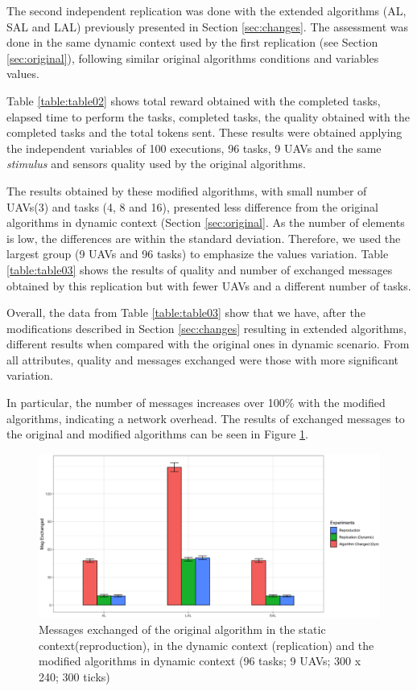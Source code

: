 The second independent replication was done with the extended algorithms (AL, SAL and LAL) previously presented in Section \ref{sec:changes}. The assessment was done in the same dynamic context used by the first replication (see Section \ref{sec:original}), following similar original algorithms conditions and variables values.

Table \ref{table:table02} shows total reward obtained with the completed tasks, elapsed time to perform the tasks, completed tasks, the quality obtained with the completed tasks and the total tokens sent. These results were obtained applying the independent variables of 100 executions, 96 tasks, 9 UAVs and the same \textit{stimulus} and sensors quality used by the original algorithms.



The results obtained by these modified algorithms, with small number of UAVs(3) and tasks (4, 8 and 16), presented less difference from the original algorithms in dynamic context (Section \ref{sec:original}. As the number of elements is low, the differences are within the standard deviation. Therefore, we used the largest group (9 UAVs and 96 tasks) to emphasize the values variation. Table \ref{table:table03} shows the results of quality and number of exchanged messages obtained by this replication but with fewer UAVs and a different number of tasks.



Overall, the data from Table \ref{table:table03} show that we have, after the modifications described in Section \ref{sec:changes} resulting in extended algorithms, different results when compared with the original ones in dynamic scenario. From all attributes, quality and messages exchanged were those with more significant variation.

In particular, the number of messages increases over 100\% with the modified algorithms, indicating a network overhead. The results of exchanged messages to the original and modified algorithms can be seen in Figure \ref{fig:fig06}.

\begin{figure}[h!]
	\begin{center}
		\includegraphics[scale=0.15]{fig/fig06.png}
		\caption{Messages exchanged of the original algorithm in the static context(reproduction), in the dynamic context (replication) and the modified algorithms in dynamic context (96 tasks; 9 UAVs; 300 x 240; 300 ticks)}
		\label{fig:fig06}
	\end{center}
\end{figure}


